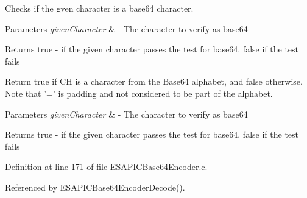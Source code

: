 Checks if the gven character is a base64 character. 


\begin{DoxyParams}{Parameters}
{\em givenCharacter} & -\/ The character to verify as base64\\
\hline
\end{DoxyParams}
\begin{DoxyReturn}{Returns}
true -\/ if the given character passes the test for base64. false if the test fails
\end{DoxyReturn}
Return true if CH is a character from the Base64 alphabet, and false otherwise. Note that '=' is padding and not considered to be part of the alphabet.


\begin{DoxyParams}{Parameters}
{\em givenCharacter} & -\/ The character to verify as base64\\
\hline
\end{DoxyParams}
\begin{DoxyReturn}{Returns}
true -\/ if the given character passes the test for base64. false if the test fails 
\end{DoxyReturn}


Definition at line 171 of file ESAPICBase64Encoder.c.



Referenced by ESAPICBase64EncoderDecode().

